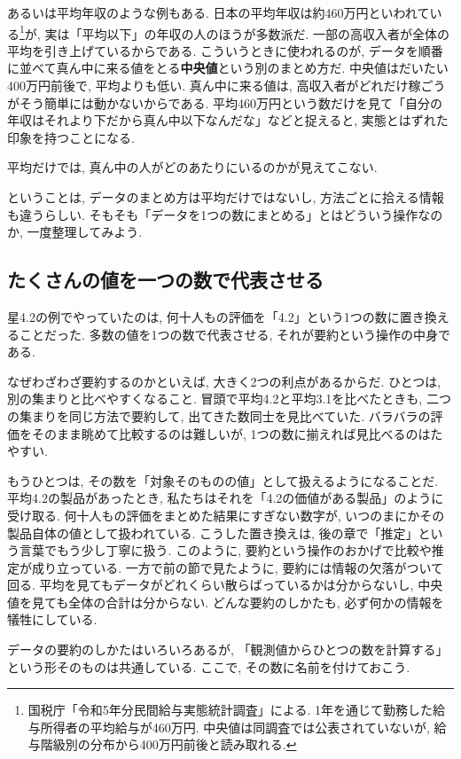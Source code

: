     あるいは平均年収のような例もある.
    日本の平均年収は約460万円といわれている\footnote{%
    国税庁「令和5年分民間給与実態統計調査」による. 1年を通じて勤務した給与所得者の平均給与が460万円. 中央値は同調査では公表されていないが, 給与階級別の分布から400万円前後と読み取れる.}が, 実は「平均以下」の年収の人のほうが多数派だ.
    一部の高収入者が全体の平均を引き上げているからである.
    こういうときに使われるのが, データを順番に並べて真ん中に来る値をとる\textbf{中央値}という別のまとめ方だ.
    中央値はだいたい400万円前後で, 平均よりも低い.
    真ん中に来る値は, 高収入者がどれだけ稼ごうがそう簡単には動かないからである.
    平均460万円という数だけを見て「自分の年収はそれより下だから真ん中以下なんだな」などと捉えると, 実態とはずれた印象を持つことになる.

    平均だけでは, 真ん中の人がどのあたりにいるのかが見えてこない.

    ということは, データのまとめ方は平均だけではないし, 方法ごとに拾える情報も違うらしい.
    そもそも「データを1つの数にまとめる」とはどういう操作なのか, 一度整理してみよう.


  \subsection{たくさんの値を一つの数で代表させる}

    星4.2の例でやっていたのは, 何十人もの評価を「4.2」という1つの数に置き換えることだった.
    多数の値を1つの数で代表させる, それが要約という操作の中身である.

    なぜわざわざ要約するのかといえば, 大きく2つの利点があるからだ.
    ひとつは, 別の集まりと比べやすくなること.
    冒頭で平均4.2と平均3.1を比べたときも, 二つの集まりを同じ方法で要約して, 出てきた数同士を見比べていた.
    バラバラの評価をそのまま眺めて比較するのは難しいが, 1つの数に揃えれば見比べるのはたやすい.

    もうひとつは, その数を「対象そのものの値」として扱えるようになることだ.
    平均4.2の製品があったとき, 私たちはそれを「4.2の価値がある製品」のように受け取る.
    何十人もの評価をまとめた結果にすぎない数字が, いつのまにかその製品自体の値として扱われている.
    こうした置き換えは, 後の章で「推定」という言葉でもう少し丁寧に扱う.
    このように, 要約という操作のおかげで比較や推定が成り立っている.
    一方で前の節で見たように, 要約には情報の欠落がついて回る.
    平均を見てもデータがどれくらい散らばっているかは分からないし, 中央値を見ても全体の合計は分からない.
    どんな要約のしかたも, 必ず何かの情報を犠牲にしている.

    データの要約のしかたはいろいろあるが, 「観測値からひとつの数を計算する」という形そのものは共通している.
    ここで, その数に名前を付けておこう.

